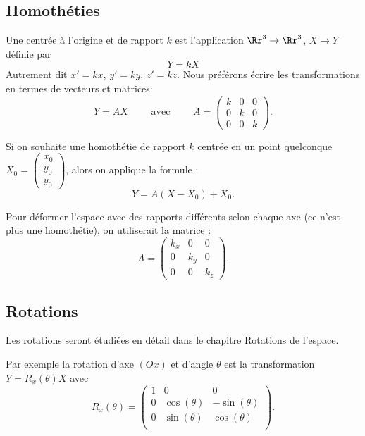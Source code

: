 \documentclass[11pt,class=report,crop=false]{standalone}
\begin{document}

\subsection{Homothéties}


Une  centrée à l'origine et de rapport $k$ est l'application $\Rr^3 \to \Rr^3$, $X \mapsto Y$ définie par 
$$Y = k X$$
Autrement dit $x'=kx$, $y'=ky$, $z'=kz$. Nous préférons écrire les transformations en termes de vecteurs et matrices:
$$Y = AX \qquad \text{ avec } \qquad A = \begin{pmatrix}k&0&0\\0&k&0\\0&0&k\end{pmatrix}.$$



Si on souhaite une homothétie de rapport $k$ centrée en un point quelconque $X_0 = \left( \begin{smallmatrix}x_0\\y_0\\y_0 \end{smallmatrix} \right)$, alors on applique la formule :
$$Y = A(X-X_0) + X_0.$$

Pour déformer l'espace avec des rapports différents selon chaque axe (ce n'est plus une homothétie), on utiliserait la matrice :
$$A = \begin{pmatrix}k_x&0&0\\0&k_y&0\\0&0&k_z\end{pmatrix}.$$



\subsection{Rotations}


Les rotations seront étudiées en détail dans le chapitre \og{}Rotations de l'espace\fg{}.

Par exemple la rotation d'axe $(Ox)$ et d'angle $\theta$ est la transformation $Y=R_x(\theta) X$ avec
$$R_x(\theta) = 
\begin{pmatrix}
1 & 0 & 0 \\	
0 & \cos(\theta) & - \sin(\theta) \\
0 & \sin(\theta) & \cos(\theta) \\
\end{pmatrix}.$$
\end{document}
